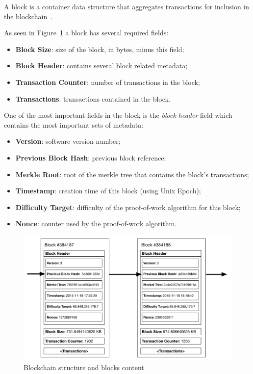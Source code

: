 A block is a container data structure that aggregates transactions for inclusion in the blockchain~\cite{Antonopoulos2014}.

As seen in Figure~\ref{fig:blockchain-structure} a block has several required fields:

\begin{itemize}
  \item \textbf{Block Size}: size of the block, in bytes, minus this field;
  \item \textbf{Block Header}: contains several block related metadata;
  \item \textbf{Transaction Counter}: number of transactions in the block;
  \item \textbf{Transactions}: transactions contained in the block.
\end{itemize}
One of the most important fields in the block is the \textit{block header} field which contains the most important sets of metadata:

\begin{itemize}
  \item \textbf{Version}: software version number;
  \item \textbf{Previous Block Hash}: previous block reference;
  \item \textbf{Merkle Root}: root of the merkle tree that contains the block's transactions;
  \item \textbf{Timestamp}: creation time of this block (using Unix Epoch);
  \item \textbf{Difficulty Target}: difficulty of the proof-of-work algorithm for this block;
  \item \textbf{Nonce}: counter used by the proof-of-work algorithm.
\end{itemize}

\begin{figure}[htb]
  \centering
  \includegraphics[scale=0.5]{Figures/blockchain-structure.pdf}
  \caption{Blockchain structure and blocks content}
\label{fig:blockchain-structure}
\end{figure}

